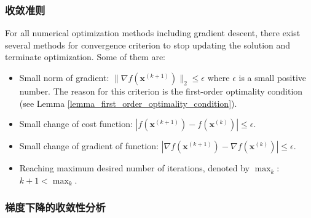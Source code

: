 \documentclass[lang=cn,10pt]{gorgeousnbook}
\numberwithin{equation}{section}%
\numberwithin{figure}{section}%
\begin{document}
\subsubsection{收敛准则}\label{section_convergence_criterion}

For all numerical optimization methods including gradient descent, there exist several methods for convergence criterion to stop updating the solution and terminate optimization. Some of them are:
\begin{itemize}
\item Small norm of gradient: $\|\nabla f(\boldsymbol{x}^{(k+1)})\|_2 \leq \epsilon$ where $\epsilon$ is a small positive number. The reason for this criterion is the first-order optimality condition (see Lemma \ref{lemma_first_order_optimality_condition}).
\item Small change of cost function: $|f(\boldsymbol{x}^{(k+1)}) - f(\boldsymbol{x}^{(k)})| \leq \epsilon$. 
\item Small change of gradient of function: $|\nabla f(\boldsymbol{x}^{(k+1)}) - \nabla f(\boldsymbol{x}^{(k)})| \leq \epsilon$. 
\item Reaching maximum desired number of iterations, denoted by $\max_k$: $k+1 < \max_k$. 
\end{itemize}

\subsubsection{梯度下降的收敛性分析}
\end{document}
